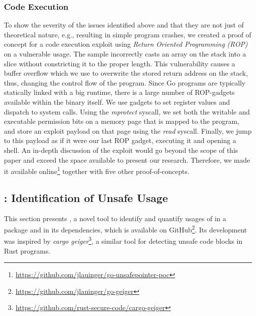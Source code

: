 \subsubsection*{Code Execution}

To show the severity of the issues identified above and that they are not just of theoretical nature, e.g., resulting in simple program crashes, we created a proof of concept for a code execution exploit using \textit{Return Oriented Programming (ROP)} on a vulnerable \unsafe{} usage. %
The sample incorrectly casts an array on the stack into a slice without constricting it to the proper length.
This vulnerability causes a buffer overflow which we use to overwrite the stored return address on the stack, thus, changing the control flow of the program. 
Since Go programs are typically statically linked with a big runtime, there is a large number of ROP-gadgets available within the binary itself. 
We use gadgets to set register values and dispatch to system calls. 
Using the \textit{mprotect} syscall, we set both the writable and executable permission bits on a memory page that is mapped to the program, and store an exploit payload on that page using the \textit{read} syscall. Finally, we jump to this payload as if it were our last ROP gadget, executing it and opening a shell.
An in-depth discussion of the exploit would go beyond the scope of this paper and exceed the space available to present our research.
Therefore, we made it available online\footnote{\url{https://github.com/jlauinger/go-unsafepointer-poc}\label{fn:poc}} together with five other proof-of-concepts. 





\subsection{\toolUsage{}: Identification of Unsafe Usage}

This section presents \toolUsage{}, a novel tool to identify and quantify usages of \unsafe{} in a package and in its dependencies, which is available on GitHub\footnote{\url{https://github.com/jlauinger/go-geiger}}.
Its development was inspired by \textit{cargo geiger}\footnote{\url{https://github.com/rust-secure-code/cargo-geiger}}, a similar tool for detecting unsafe code blocks in Rust programs.



